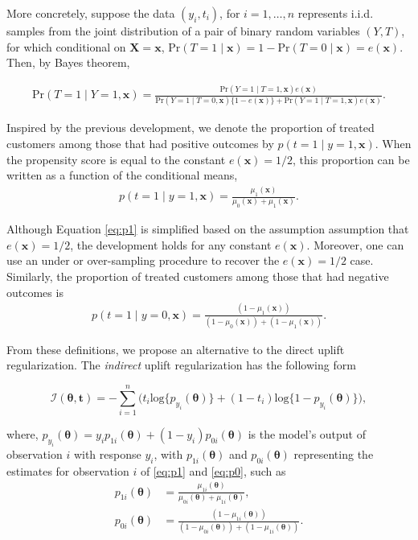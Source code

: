 \documentclass{article}
\def\tt{\mathbf t}
\def\X{\mathbf X}
\def\x{\mathbf x}
\begin{document}
More concretely, suppose the data $(y_i, t_i)$, for $i=1,\dots,n$ represents i.i.d. samples from the joint distribution of a pair of binary random variables $(Y,T)$, for which conditional on $\X=\x$, $\mathrm{Pr}(T = 1 \mid \x) = 1 - \mathrm{Pr}(T = 0 \mid \x) = e(\x)$. Then, by Bayes theorem,

\begin{align*}
    \mathrm{Pr}(T=1 \mid Y=1, \x) = \frac{ \mathrm{Pr}(Y=1 \mid T=1, \x)  e(\x)}{\mathrm{Pr}(Y=1 \mid T=0, \x) \{1- e(\x)\} + \mathrm{Pr}(Y=1 \mid T=1, \x)e(\x)} .
\end{align*}

Inspired by the previous development, we denote the proportion of treated customers among those that had positive outcomes by $p(t=1\mid y=1,\x)$. When the propensity score is equal to the constant $e(\x) = 1/2$, this proportion can be written as a function of the conditional means, 
\begin{align}
    p(t=1\mid y=1,\x) = \frac{\mu_1(\x)}{\mu_0(\x) + \mu_1(\x)}.
    \label{eq:p1}
\end{align}

Although Equation \eqref{eq:p1} is simplified based on the assumption assumption that $e(\x) = 1/2$, the development holds for any constant $e(\x)$. Moreover, one can use an under or over-sampling procedure to recover the $e(\x) = 1/2$ case. Similarly, the proportion of treated customers among those that had negative outcomes is
\begin{align}
    p(t=1\mid y=0,\x) = \frac{(1-\mu_1(\x))}{(1-\mu_0(\x)) +(1- \mu_1(\x))}.
    \label{eq:p0}
\end{align}

From these definitions, we propose an alternative to the direct uplift regularization. The \textit{indirect} uplift regularization has the following form

\begin{equation*}
    \mathcal{I}(\boldsymbol{\theta}, 
    \tt) =   - \sum_{i=1}^{n} \Big( t_i\mathrm{log} \{p_{y_i}(\boldsymbol{\theta})\} + (1-t_i) \mathrm{log} \{1-p_{y_i}(\boldsymbol{\theta})\} \Big),
\end{equation*}

where, $p_{y_i}(\boldsymbol{\theta}) = y_i p_{1i}(\boldsymbol{\theta}) + (1-y_i) p_{0i}(\boldsymbol{\theta})$ is the model's output of observation $i$ with response $y_i$, with $p_{1i}(\boldsymbol{\theta})$ and $p_{0i}(\boldsymbol{\theta})$  representing the estimates for observation $i$ of \eqref{eq:p1} and \eqref{eq:p0}, such as
\begin{align*}
    p_{1i}(\boldsymbol{\theta}) &= \frac{\mu_{1i}(\boldsymbol{\theta})}{\mu_{0i}(\boldsymbol{\theta}) +\mu_{1i}(\boldsymbol{\theta})}, \\
    p_{0i}(\boldsymbol{\theta}) &= \frac{(1-\mu_{1i}(\boldsymbol{\theta}))}{(1-\mu_{0i}(\boldsymbol{\theta})) +(1- \mu_{1i}(\boldsymbol{\theta}))}.
\end{align*}
\end{document}
